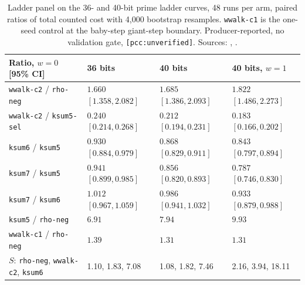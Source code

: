 \begin{table}[t]
\centering\small
\begin{tabular}{@{}llll@{}}
\toprule
Ratio, $w=0$ [95\% CI] & 36 bits & 40 bits & 40 bits, $w=1$ \\
\midrule
\texttt{wwalk-c2} / \texttt{rho-neg} & $1.660$ $[1.358,2.082]$ & $1.685$ $[1.386,2.093]$ & $1.822$ $[1.486,2.273]$ \\
\texttt{wwalk-c2} / \texttt{ksum5-sel} & $0.240$ $[0.214,0.268]$ & $0.212$ $[0.194,0.231]$ & $0.183$ $[0.166,0.202]$ \\
\texttt{ksum6} / \texttt{ksum5} & $0.930$ $[0.884,0.979]$ & $0.868$ $[0.829,0.911]$ & $0.843$ $[0.797,0.894]$ \\
\texttt{ksum7} / \texttt{ksum5} & $0.941$ $[0.899,0.985]$ & $0.856$ $[0.820,0.893]$ & $0.787$ $[0.746,0.830]$ \\
\texttt{ksum7} / \texttt{ksum6} & $1.012$ $[0.967,1.059]$ & $0.986$ $[0.941,1.032]$ & $0.933$ $[0.879,0.988]$ \\
\texttt{ksum5} / \texttt{rho-neg} & $6.91$ & $7.94$ & $9.93$ \\
\texttt{wwalk-c1} / \texttt{rho-neg} & $1.39$ & $1.31$ & $1.31$ \\
\addlinespace
$S$: \texttt{rho-neg}, \texttt{wwalk-c2}, \texttt{ksum6} & 1.10, 1.83, 7.08 & 1.08, 1.82, 7.46 & 2.16, 3.94, 18.11 \\
\bottomrule
\end{tabular}
\caption[]{Ladder panel on the 36- and 40-bit prime ladder curves, 48 runs
per arm, paired ratios of total counted cost with 4{,}000 bootstrap
resamples. \texttt{wwalk-c1} is the one-seed control at the
baby-step giant-step boundary. Producer-reported, no validation gate,
\texttt{[pcc:unverified]}. Sources:
,
.}
\label{tab:pg-ladder}
\end{table}

